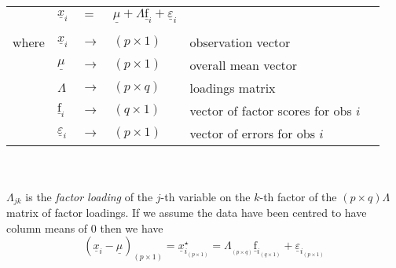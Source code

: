 \documentclass[a4paper,12pt,fleqn]{article}
\numberwithin{equation}{section}
\begin{document}
\noindent\begin{tabular}{l l l l l l}
& $\underline{x}_i$ & $=$ & $\underline{\mu} + \Lambda\underline{\text{f}}_i + \underline{\varepsilon}_i$&\\
	\\
	where  & $\underline{x}_i$ & $\rightarrow$ & $\left(p \times 1\right)$ & observation vector \\
	& $\underline{\mu}$ &  $\rightarrow$ & $\left(p \times 1\right)$  & overall mean vector \\
	& $\Lambda$ &  $\rightarrow$ & $\left(p \times q\right)$  & loadings matrix \\
	& $\underline{\text{f}}_i$ &  $\rightarrow$ & $\left(q \times 1\right)$  & vector of factor scores for obs $i$ \\
	& $\underline{\varepsilon}_i$ & $\rightarrow$ & $\left(p \times 1\right)$  & vector of errors for obs $i$ \\
\end{tabular}
\\ \\
$\Lambda_{jk}$ is the \textit{factor loading} of the $j$-th variable on the $k$-th factor of the $\left(p \times q\right) \Lambda$ matrix of factor loadings. If we assume the data have been centred to have column means of 0 then we have
\begin{equation}
\label{eq:1}
\left(\underline{x}_i - \underline{\mu}_{}\right)_{\left(p \times 1\right)} = \underline{x}_{i_{\left(p \times 1\right)}}^\star = \Lambda_{_{\left(p \times q\right)}}\underline{\text{f}}_{i_{\left(q \times 1\right)}} + \underline{\varepsilon}_{i_{\left(p \times 1\right)}}
\end{equation}
\end{document}
